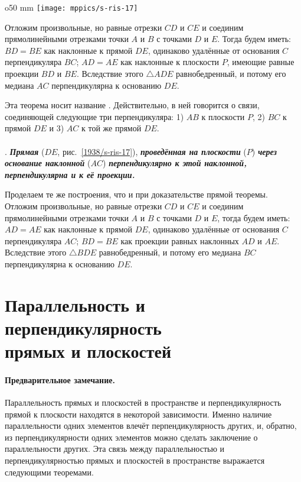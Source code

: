 \begin{wrapfigure}{o}{50 mm}
\centering
\texttt{[image: mppics/s-ris-17]}
\caption{}\label{1938/s-ris-17}
\end{wrapfigure}

Отложим произвольные, но равные отрезки $CD$ и $CE$ и соединим прямолинейными отрезками точки $A$ и $B$ с точками $D$ и $E$.
Тогда будем иметь: $BD=BE$ как наклонные к прямой $DE$, одинаково удалённые от основания $C$ перпендикуляра $BC$;
$AD=AE$ как наклонные к плоскости $P$, имеющие равные проекции $BD$ и $BE$.
Вследствие этого $\triangle ADE$ равнобедренный, и потому его медиана $AC$ перпендикулярна к основанию $DE$.

Эта теорема носит название .
Действительно, в ней говорится о связи, соединяющей следующие три перпендикуляра: 1) $AB$ к плоскости $P$, 2) $BC$ к прямой $DE$ и 3) $AC$ к той же прямой $DE$.


\paragraph{}\label{1938/s29}
.
\textbf{\emph{Прямая}} ($DE$, рис.~\ref{1938/s-ris-17}), \textbf{\emph{проведённая на плоскости}} ($P$) \textbf{\emph{через основание наклонной}} ($AC$) \textbf{\emph{перпендикулярно к этой наклонной, перпендикулярна и к её проекции.}}

Проделаем те же построения, что и при доказательстве прямой теоремы.
Отложим произвольные, но равные отрезки $CD$ и $CE$ и соединим прямолинейными отрезками точки $A$ и $B$ с точками $D$ и $E$, тогда будем иметь: $AD=AE$ как наклонные к прямой $DE$, одинаково удалённые от основания $C$ перпендикуляра $AC$;
$BD=BE$ как проекции равных наклонных $AD$ и $AE$.
Вследствие этого $\triangle BDE$ равнобедренный, и потому его медиана $BC$ перпендикулярна к основанию $DE$.



\section[Параллельность и перпендикулярность]{Параллельность и перпендикулярность\\ прямых и плоскостей}


\paragraph{Предварительное замечание.}\label{1938/s30}
Параллельность прямых и плоскостей в пространстве и перпендикулярность прямой к плоскости находятся в некоторой зависимости.
Именно наличие параллельности одних элементов влечёт перпендикулярность других, и, обратно, из перпендикулярности одних элементов можно сделать заключение о параллельности других.
Эта связь между параллельностью и перпендикулярностью прямых и плоскостей в пространстве выражается следующими теоремами.

